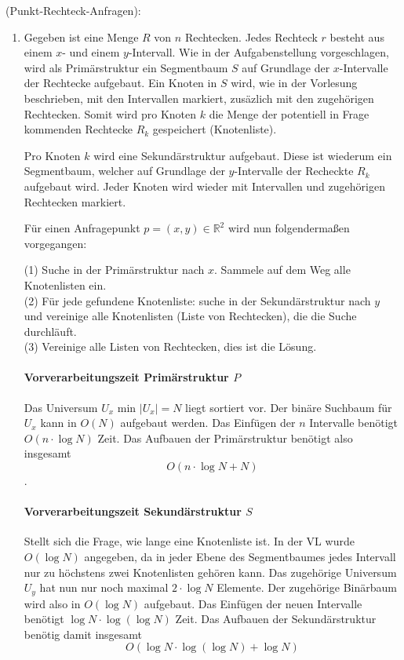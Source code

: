 \documentclass[a4paper, titlepage=false, parskip=full-, 10pt]{scrartcl}
\newcounter{tasknbr}
\newenvironment{task}[1]{{\bf Aufgabe \arabic {tasknbr}\stepcounter{tasknbr}} (#1):\begin{enumerate}}{\end{enumerate}}
\begin{document}
\newpage
\begin{task}{Punkt-Rechteck-Anfragen}
\item[]
Gegeben ist eine Menge $R$ von $n$ Rechtecken. Jedes Rechteck $r$ besteht aus einem $x$- und einem $y$-Intervall. Wie in der Aufgabenstellung vorgeschlagen, wird als Primärstruktur ein Segmentbaum $S$ auf Grundlage der $x$-Intervalle der Rechtecke aufgebaut. Ein Knoten in $S$ wird, wie in der Vorlesung beschrieben, mit den Intervallen markiert, zusäzlich mit den zugehörigen Rechtecken. Somit wird pro Knoten $k$ die Menge der potentiell in Frage kommenden Rechtecke $R_k$ gespeichert (Knotenliste).

Pro Knoten $k$ wird eine Sekundärstruktur aufgebaut. Diese ist wiederum ein Segmentbaum, welcher auf Grundlage der $y$-Intervalle der Recheckte $R_k$ aufgebaut wird. Jeder Knoten wird wieder mit Intervallen und zugehörigen Rechtecken markiert.

Für einen Anfragepunkt $p=(x,y) \in \mathbb{R}^2$ wird nun folgendermaßen vorgegangen:

(1) Suche in der Primärstruktur nach $x$. Sammele auf dem Weg alle Knotenlisten ein.\\
(2) Für jede gefundene Knotenliste: suche in der Sekundärstruktur nach $y$ und vereinige alle Knotenlisten (Liste von Rechtecken), die die Suche durchläuft.\\
(3) Vereinige alle Listen von Rechtecken, dies ist die Lösung.\\

\paragraph*{Vorverarbeitungszeit Primärstruktur $P$}
Das Universum $U_x$ min $|U_x|=N$ liegt sortiert vor. Der binäre Suchbaum für $U_x$ kann in $O(N)$ aufgebaut werden. Das Einfügen der $n$ Intervalle benötigt $O(n\cdot \log N)$ Zeit. Das Aufbauen der Primärstruktur benötigt also insgesamt $$O(n \cdot \log N + N)$$.

\paragraph*{Vorverarbeitungszeit Sekundärstruktur $S$} 
Stellt sich die Frage, wie lange eine Knotenliste ist. In der VL wurde $O(\log N)$ angegeben, da in jeder Ebene des Segmentbaumes jedes Intervall nur zu höchstens zwei Knotenlisten gehören kann. Das zugehörige Universum $U_y$ hat nun nur noch maximal $2 \cdot \log N$ Elemente. Der zugehörige Binärbaum wird also in $O(\log N)$ aufgebaut. Das Einfügen der neuen Intervalle benötigt $\log N \cdot \log(\log N)$ Zeit. Das Aufbauen der Sekundärstruktur benötig damit insgesamt $$O(\log N \cdot \log(\log N ) + \log N)$$


\end{task}
\end{document}
